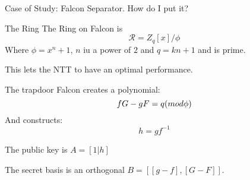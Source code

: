 \documentclass[presentation]{beamer}
\begin{document}
\begin{frame}[label=case-of-study-falcon]{Case of Study: Falcon}
  Separator. How do I put it? 
\end{frame}
\begin{frame}[label=the-ring]{The Ring}
  The Ring on Falcon is
  \[
    \mathcal R = Z_q[x] / \phi
  \]
  Where
  \(\phi = x^n + 1\), \(n\) iu a power of \(2\) and \(q = kn +
  1\) and is
  prime.

  This lets the NTT to have an optimal performance. 
\end{frame}
\begin{frame}[label=the-trapdoor]{The trapdoor}
  Falcon creates a polynomial:
  \[
    fG - gF = q \text({mod } \phi \text{)}
  \]
  And constructs:
  \[
    h = gf^{-1}
  \]

  The public key is \(A = [1 | h]\)

  The secret basis is an orthogonal \(B = [[g -f],[G -F]]\).

\end{frame}
\end{document}
